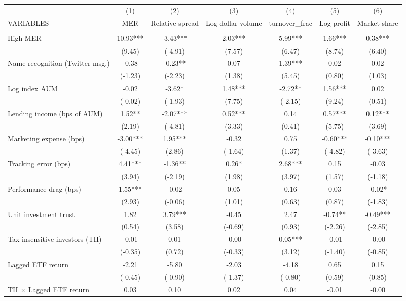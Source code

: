\documentclass[]{article}
\begin{document}
\begin{tabular}{lcccccc} \hline
 & (1) & (2) & (3) & (4) & (5) & (6) \\
VARIABLES & MER & Relative spread & Log dollar volume & turnover\_frac & Log profit & Market share \\ \hline
 &  &  &  &  &  &  \\
High MER & 10.93*** & -3.43*** & 2.03*** & 5.99*** & 1.66*** & 0.38*** \\
 & (9.45) & (-4.91) & (7.57) & (6.47) & (8.74) & (6.40) \\
Name recognition (Twitter msg.) & -0.38 & -0.23** & 0.07 & 1.39*** & 0.02 & 0.02 \\
 & (-1.23) & (-2.23) & (1.38) & (5.45) & (0.80) & (1.03) \\
Log index AUM & -0.02 & -3.62* & 1.48*** & -2.72** & 1.56*** & 0.02 \\
 & (-0.02) & (-1.93) & (7.75) & (-2.15) & (9.24) & (0.51) \\
Lending income (bps of AUM) & 1.52** & -2.07*** & 0.52*** & 0.14 & 0.57*** & 0.12*** \\
 & (2.19) & (-4.81) & (3.33) & (0.41) & (5.75) & (3.69) \\
Marketing expense (bps) & -3.00*** & 1.95*** & -0.32 & 0.75 & -0.60*** & -0.10*** \\
 & (-4.45) & (2.86) & (-1.64) & (1.37) & (-4.82) & (-3.63) \\
Tracking error (bps) & 4.41*** & -1.36** & 0.26* & 2.68*** & 0.15 & -0.03 \\
 & (3.94) & (-2.19) & (1.98) & (3.97) & (1.57) & (-1.18) \\
Performance drag (bps) & 1.55*** & -0.02 & 0.05 & 0.16 & 0.03 & -0.02* \\
 & (2.93) & (-0.06) & (1.01) & (0.63) & (0.87) & (-1.83) \\
Unit investment trust & 1.82 & 3.79*** & -0.45 & 2.47 & -0.74** & -0.49*** \\
 & (0.54) & (3.58) & (-0.69) & (0.93) & (-2.26) & (-2.85) \\
Tax-insensitive investors (TII) & -0.01 & 0.01 & -0.00 & 0.05*** & -0.01 & -0.00 \\
 & (-0.35) & (0.72) & (-0.33) & (3.12) & (-1.40) & (-0.85) \\
Lagged ETF return & -2.21 & -5.80 & -2.03 & -4.18 & 0.65 & 0.15 \\
 & (-0.45) & (-0.90) & (-1.37) & (-0.80) & (0.59) & (0.85) \\
TII $\times$ Lagged ETF return & 0.03 & 0.10 & 0.02 & 0.04 & -0.01 & -0.00 \\

\end{tabular}
\end{document}
